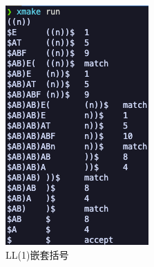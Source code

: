 \begin{figure}[htbp]
\begin{minipage}[t]{0.3\textwidth}
        \includegraphics[width=\textwidth]{images/ll_5.png}
        \caption{LL(1)嵌套括号}
        \label{fig:ll-5}
    \end{minipage}
    \begin{minipage}[t]{0.3\textwidth}
        \centering

\end{minipage}
\end{figure}
